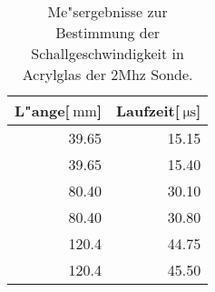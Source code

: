 
\begin{table}[!h]
\begin{center}
\begin{tabular}{|r|r|}
\hline
 L"ange[$\SI{}{\milli\meter}$] & Laufzeit[$\SI{}{\micro\second}$]\\
\hline
\hline
39.65 &	15.15\\
39.65 &	15.40\\
80.40 &	30.10\\
80.40 &	30.80\\
120.4 &	44.75\\
120.4 &	45.50\\
\hline
\end{tabular}
\caption[]{Me"sergebnisse zur Bestimmung der Schallgeschwindigkeit in Acrylglas der 2Mhz Sonde.}
\label{a2}
\end{center}
\end{table}